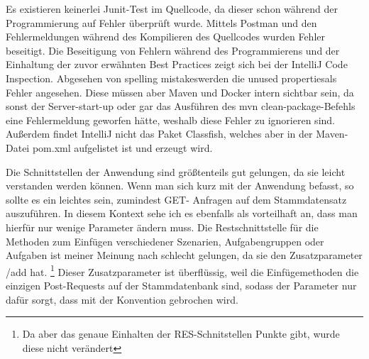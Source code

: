 \documentclass[fleqn,10pt,ngerman]{SelfArx}
\begin{document}
\newpage
	Es existieren keinerlei Junit-Test im Quellcode, da dieser schon während der Programmierung auf Fehler überprüft wurde. Mittels Postman und den Fehlermeldungen während des Kompilieren des Quellcodes wurden Fehler beseitigt. 
	Die Beseitigung von Fehlern während des Programmierens und der Einhaltung der zuvor erwähnten Best Practices zeigt sich bei der IntelliJ Code Inspection. Abgesehen von \dq spelling mistakes\dq werden die \dq unused properties\dq als Fehler angesehen. Diese müssen aber Maven und Docker intern sichtbar sein, da sonst der Server-start-up oder gar das Ausführen des mvn clean-package-Befehls eine Fehlermeldung geworfen hätte, weshalb diese Fehler zu ignorieren sind. 
	Außerdem findet IntelliJ nicht das Paket \dq Classfish\dq , welches aber in der Maven-Datei pom.xml aufgelistet ist und erzeugt wird.
	
	Die Schnittstellen der Anwendung sind größtenteils gut gelungen, da sie leicht verstanden werden können. Wenn man sich kurz mit der Anwendung befasst, so sollte es ein leichtes sein, zumindest GET- Anfragen auf dem Stammdatensatz auszuführen.  In diesem Kontext sehe ich es ebenfalls als vorteilhaft an, dass man hierfür nur wenige Parameter ändern muss. Die Restschnittstelle für die Methoden zum Einfügen verschiedener Szenarien, Aufgabengruppen oder Aufgaben ist meiner Meinung nach schlecht gelungen, da sie den Zusatzparameter /add hat. \footnote{Da aber das genaue Einhalten der RES-Schnitstellen Punkte gibt, wurde diese nicht verändert} Dieser Zusatzparameter ist überflüssig, weil die Einfügemethoden die einzigen Post-Requests auf der Stammdatenbank sind, sodass der Parameter nur dafür sorgt, dass mit der Konvention gebrochen wird.
\end{document}
